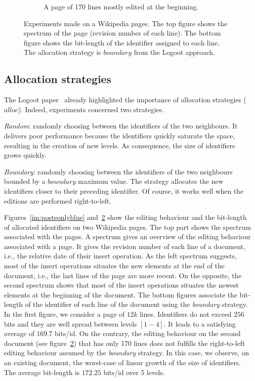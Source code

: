 \begin{figure}
\begin{subfigure}[t]{0.47\textwidth}
\caption{A page of 170 lines mostly edited at the beginning.}
\label{im:didyouknowonlyblue}
\end{subfigure}
\caption{Experiments made on a Wikipedia pages. The top figure shows the
  spectrum of the page (revision number of each line). The bottom figure shows
  the bit-length of the identifier assigned to each line. The allocation
  strategy is $boundary$ from the Logoot approach.}
\end{figure}

\subsection{Allocation strategies}
The Logoot paper~\cite{weiss2009logoot} already highlighted the importance of
allocation strategies ($alloc$). Indeed, experiments concerned two strategies.
\begin{inparaenum}[(1)]
\item \emph{Random}: randomly choosing between the identifiers of the two
  neighbours. It delivers poor performance because the identifiers quickly
  saturate the space, resulting in the creation of new levels. As consequence,
  the size of identifiers grows quickly.
\item \emph{Boundary}: randomly choosing between the identifiers of the two
  neighbours bounded by a $boundary$ maximum value. The strategy allocates the
  new identifiers closer to their preceding identifier. Of course, it works
  well when the editions are performed right-to-left.
\end{inparaenum}

Figures~\ref{im:posteonlyblue} and~\ref{im:didyouknowonlyblue} show the editing
behaviour and the bit-length of allocated identifiers on two Wikipedia
pages. The top part shows the spectrum associated with the pages. A spectrum
gives an overview of the editing behaviour associated with a page. It gives the
revision number of each line of a document, i.e., the relative date of their
insert operation.  As the left spectrum suggests, most of the insert operations
situates the new elements at the end of the document, i.e., the last lines of
the page are more recent. On the opposite, the second spectrum shows that most
of the insert operations situates the newest elements at the beginning of the
document.  The bottom figures associate the bit-length of the identifier of
each line of the document using the \emph{boundary} strategy. In the first
figure, we consider a page of $12k$ lines. Identifiers do not exceed $256$ bits
and they are well spread between levels $[1-4]$. It leads to a satisfying
average of $169.7$ bits/id. On the contrary, the editing behaviour on the
second document (see figure~\ref{im:didyouknowonlyblue}) that has only 170
lines does not fulfills the right-to-left editing behaviour assumed by the
\emph{boundary} strategy. In this case, we observe, on an existing document,
the worst-case of linear growth of the size of identifiers.  The average
bit-length is $172.25$ bits/id over 5 levels.

